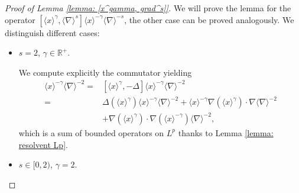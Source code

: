 \documentclass[12pt]{article}
\newcommand{\R}{\mathbb{R}}
\theoremstyle{plain}
\begin{document}
\begin{proof}[Proof of Lemma \ref{lemma: [x^gamma, grad^s]}]
We will prove the lemma for the operator $[\langle x \rangle^\gamma , \langle \nabla \rangle^s]\langle x \rangle^{-\gamma} \langle \nabla \rangle^{-s} $, the other case can be proved analogously. 
We distinguish different cases: 
\begin{itemize}
    \item $s=2$, $\gamma \in \R^+$.

 We compute explicitly the commutator yielding
    \begin{align*}
        [\langle x \rangle^\gamma, \langle \nabla \rangle^2]\langle x \rangle^{-\gamma} \langle \nabla \rangle^{-2} =& [\langle x \rangle^\gamma, -\Delta]\langle x \rangle^{-\gamma} \langle \nabla \rangle^{-2}\\
        = &  \Delta (\langle x \rangle^\gamma) \langle x \rangle^{-\gamma} \langle \nabla \rangle^{-2} +  \langle x \rangle^{-\gamma} \nabla (\langle x \rangle^{\gamma})\cdot \nabla \langle \nabla \rangle^{-2} \\
        & + \nabla ( \langle x \rangle^{\gamma})\cdot \nabla ( \langle x \rangle^{-\gamma})  \langle \nabla \rangle^{-2}, 
    \end{align*}
    which is a sum of bounded operators on $L^p$ thanks to Lemma \ref{lemma: resolvent Lp}.
    
    \item $s \in [0,2)$,  $\gamma = 2$. 
    

\end{itemize}
\end{proof}
\end{document}
